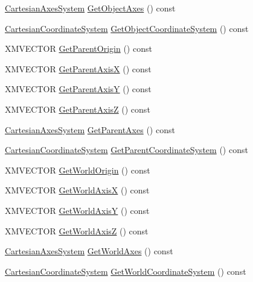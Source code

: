 \begin{DoxyCompactItemize}
\item 
\hyperlink{structmage_1_1_cartesian_axes_system}{Cartesian\+Axes\+System} \hyperlink{structmage_1_1_transform_a814f749d70104ec5732a741b0b2b7220}{Get\+Object\+Axes} () const
\item 
\hyperlink{structmage_1_1_cartesian_coordinate_system}{Cartesian\+Coordinate\+System} \hyperlink{structmage_1_1_transform_a6c14d929c23c6b6e065e7f9b0ed919ea}{Get\+Object\+Coordinate\+System} () const
\item 
X\+M\+V\+E\+C\+T\+OR \hyperlink{structmage_1_1_transform_a4c33d968669e0342bdff3582825549ae}{Get\+Parent\+Origin} () const
\item 
X\+M\+V\+E\+C\+T\+OR \hyperlink{structmage_1_1_transform_afd81bb8bef70bebc59df3ff157d53bc9}{Get\+Parent\+AxisX} () const
\item 
X\+M\+V\+E\+C\+T\+OR \hyperlink{structmage_1_1_transform_a973c17d7d77c742f0b6d8fbdf5041128}{Get\+Parent\+AxisY} () const
\item 
X\+M\+V\+E\+C\+T\+OR \hyperlink{structmage_1_1_transform_a6b8002971da0bd9acbbd865c7325c860}{Get\+Parent\+AxisZ} () const
\item 
\hyperlink{structmage_1_1_cartesian_axes_system}{Cartesian\+Axes\+System} \hyperlink{structmage_1_1_transform_acdd8950649ae1a779c254da82136033a}{Get\+Parent\+Axes} () const
\item 
\hyperlink{structmage_1_1_cartesian_coordinate_system}{Cartesian\+Coordinate\+System} \hyperlink{structmage_1_1_transform_a3d6f03cda826eaf99a2d39e5c900fcbe}{Get\+Parent\+Coordinate\+System} () const
\item 
X\+M\+V\+E\+C\+T\+OR \hyperlink{structmage_1_1_transform_aad81c0c7af0f29bb3ead6c8112de262c}{Get\+World\+Origin} () const
\item 
X\+M\+V\+E\+C\+T\+OR \hyperlink{structmage_1_1_transform_ac7a718127c5212bb73d04302371473d0}{Get\+World\+AxisX} () const
\item 
X\+M\+V\+E\+C\+T\+OR \hyperlink{structmage_1_1_transform_a9c4452fa4aefb48e4e6c9a4a38fac32c}{Get\+World\+AxisY} () const
\item 
X\+M\+V\+E\+C\+T\+OR \hyperlink{structmage_1_1_transform_a580b65d46b4af8086fab60d0737fd353}{Get\+World\+AxisZ} () const
\item 
\hyperlink{structmage_1_1_cartesian_axes_system}{Cartesian\+Axes\+System} \hyperlink{structmage_1_1_transform_a580a4f9fd987259da0cf0355ade7fb4b}{Get\+World\+Axes} () const
\item 
\hyperlink{structmage_1_1_cartesian_coordinate_system}{Cartesian\+Coordinate\+System} \hyperlink{structmage_1_1_transform_a809600adbb284334d444ae8c50b17a1d}{Get\+World\+Coordinate\+System} () const

\end{DoxyCompactItemize}
